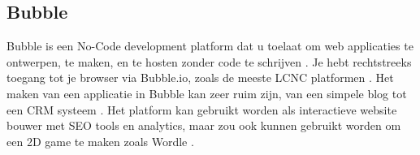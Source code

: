 

\subsection{Bubble}%
\label{subsec:bubble}
Bubble is een No-Code development platform dat u toelaat om web applicaties te ontwerpen, te maken, en te hosten zonder code te schrijven \autocite{Sharma2022}.
Je hebt rechtstreeks toegang tot je browser via Bubble.io, zoals de meeste LCNC platformen \autocite{Minor2022}. Het maken van een applicatie in Bubble kan zeer ruim zijn, van een simpele blog tot een CRM systeem \autocite{Sharma2022}.
Het platform kan gebruikt worden als interactieve website bouwer met SEO tools en analytics, maar zou ook kunnen gebruikt worden om een 2D game te maken zoals Wordle \autocite{Minor2022}.

